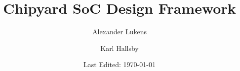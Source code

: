 \documentclass[oneside]{book}
\title{Chipyard SoC Design Framework}
\author{Alexander Lukens \and Karl Hallsby}
\date{Last Edited: \today}
\affil{Illinois Institute of Technology}
\begin{document}
\frontmatter
\maketitle
\tableofcontents

\mainmatter{}



\end{document}
